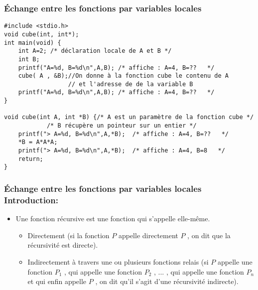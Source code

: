 \documentclass{beamer}
\begin{document}
\begin{frame}[fragile]
\frametitle{Échange entre les fonctions par variables locales}

\begin{verbatim}
#include <stdio.h>                         
void cube(int, int*);
int main(void) {
    int A=2; /* déclaration locale de A et B */
    int B;
    printf("A=%d, B=%d\n",A,B);	/* affiche : A=4, B=??   */
    cube( A , &B);//On donne à la fonction cube le contenu de A 
                  // et l'adresse de de la variable B
    printf("A=%d, B=%d\n",A,B);	/* affiche : A=4, B=??   */	
}

void cube(int A, int *B) {/* A est un paramètre de la fonction cube */
			/* B récupère un pointeur sur un entier */
    printf("> A=%d, B=%d\n",A,*B);	/* affiche : A=4, B=??   */
    *B = A*A*A;
    printf("> A=%d, B=%d\n",A,*B);	/* affiche : A=4, B=8   */
    return;
}

\end{verbatim}

\end{frame}
\begin{frame}
\frametitle{Échange entre les fonctions par variables locales\\Introduction: }
\begin{itemize}
\item Une fonction récursive est une fonction qui s'appelle elle-même. 
\begin{itemize}
\item Directement (si la fonction $P$ appelle directement $P$ , on dit que la récursivité est directe). 
\item  Indirectement à travers une ou plusieurs fonctions relais (si $P$ appelle une fonction $P_1$ , qui appelle une fonction $P_2$ , ... , qui appelle une fonction $P_n$ et qui enfin appelle $P$ , on dit qu'il s'agit d'une récursivité indirecte).
\end{itemize}
\end{itemize}
\end{frame}
  
\end{document}
